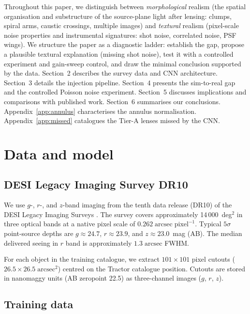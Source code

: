 \documentclass[fleqn,usenatbib]{mnras}
\begin{document}
Throughout this paper, we distinguish between \emph{morphological} realism (the spatial organisation and substructure of the source-plane light after lensing: clumps, spiral arms, caustic crossings, multiple images) and \emph{textural} realism (pixel-scale noise properties and instrumental signatures: shot noise, correlated noise, PSF wings).  We structure the paper as a diagnostic ladder: establish the gap, propose a plausible textural explanation (missing shot noise), test it with a controlled experiment and gain-sweep control, and draw the minimal conclusion supported by the data.  Section~2 describes the survey data and CNN architecture.  Section~3 details the injection pipeline.  Section~4 presents the sim-to-real gap and the controlled Poisson noise experiment.  Section~5 discusses implications and comparisons with published work.  Section~6 summarises our conclusions.  Appendix~\ref{app:annulus} characterises the annulus normalisation.  Appendix~\ref{app:missed} catalogues the Tier-A lenses missed by the CNN.


\section{Data and model}

\subsection{DESI Legacy Imaging Survey DR10}

We use $g$-, $r$-, and $z$-band imaging from the tenth data release (DR10) of the DESI Legacy Imaging Surveys \citep{Dey2019}.  The survey covers approximately 14\,000~deg$^{2}$ in three optical bands at a native pixel scale of $0.262\;\mathrm{arcsec\;pixel^{-1}}$.  Typical $5\sigma$ point-source depths are $g \approx 24.7$, $r \approx 23.9$, and $z \approx 23.0$~mag (AB).  The median delivered seeing in $r$ band is approximately $1.3\;\mathrm{arcsec}$ FWHM.

For each object in the training catalogue, we extract $101 \times 101$ pixel cutouts ($26.5 \times 26.5\;\mathrm{arcsec}^{2}$) centred on the Tractor catalogue position.  Cutouts are stored in nanomaggy units (AB zeropoint 22.5) as three-channel images ($g$, $r$, $z$).

\subsection{Training data}
\end{document}
